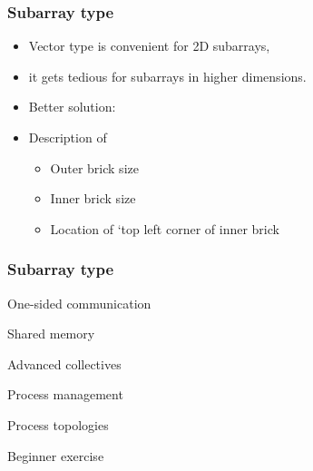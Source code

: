 \documentclass[11pt,headernav]{beamer}
\begin{document}
\begin{frame}[containsverbatim]\frametitle{Subarray type}
  \begin{itemize}
  \item Vector type is convenient for 2D subarrays,
  \item it gets tedious for subarrays in higher dimensions.
  \item Better solution: 
  \item Description of
    \begin{itemize}
    \item Outer brick size
    \item Inner brick size
    \item Location of `top left corner of inner brick
    \end{itemize}
  \end{itemize}
\end{frame}

\begin{frame}[containsverbatim]\frametitle{Subarray type}
\end{frame}

\begin{exerciseframe}[cubegather]
  
\end{exerciseframe}

 {One-sided communication}
 

 {Shared memory}


 {Advanced collectives}


 {Process management}


 {Process topologies}


 {Beginner exercise}

\begin{exerciseframe}
  
\end{exerciseframe}
\end{document}
